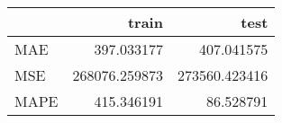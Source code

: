 \begin{tabular}{lrr}
\toprule
{} &          train &           test \\
\midrule
MAE  &     397.033177 &     407.041575 \\
MSE  &  268076.259873 &  273560.423416 \\
MAPE &     415.346191 &      86.528791 \\
\bottomrule
\end{tabular}
